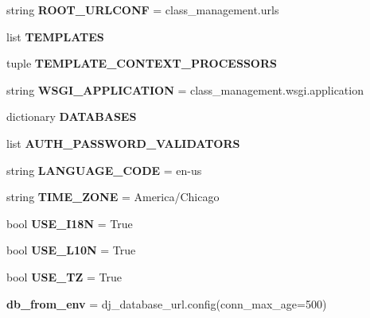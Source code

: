 \begin{DoxyCompactItemize}
string {\bfseries R\+O\+O\+T\+\_\+\+U\+R\+L\+C\+O\+NF} = \textquotesingle{}class\+\_\+management.\+urls\textquotesingle{}
\item 
list {\bfseries T\+E\+M\+P\+L\+A\+T\+ES}
\item 
tuple {\bfseries T\+E\+M\+P\+L\+A\+T\+E\+\_\+\+C\+O\+N\+T\+E\+X\+T\+\_\+\+P\+R\+O\+C\+E\+S\+S\+O\+RS}
\item 
\hypertarget{namespaceclass__management_1_1settings_a4daa790d95249e0381831ded20ae7fe8}{}\label{namespaceclass__management_1_1settings_a4daa790d95249e0381831ded20ae7fe8} 
string {\bfseries W\+S\+G\+I\+\_\+\+A\+P\+P\+L\+I\+C\+A\+T\+I\+ON} = \textquotesingle{}class\+\_\+management.\+wsgi.\+application\textquotesingle{}
\item 
dictionary {\bfseries D\+A\+T\+A\+B\+A\+S\+ES}
\item 
list {\bfseries A\+U\+T\+H\+\_\+\+P\+A\+S\+S\+W\+O\+R\+D\+\_\+\+V\+A\+L\+I\+D\+A\+T\+O\+RS}
\item 
\hypertarget{namespaceclass__management_1_1settings_a3d1bc70203582e588cc54fd61526f279}{}\label{namespaceclass__management_1_1settings_a3d1bc70203582e588cc54fd61526f279} 
string {\bfseries L\+A\+N\+G\+U\+A\+G\+E\+\_\+\+C\+O\+DE} = \textquotesingle{}en-\/us\textquotesingle{}
\item 
\hypertarget{namespaceclass__management_1_1settings_a6619fdf6cb6342bb4da80f9b66ca1850}{}\label{namespaceclass__management_1_1settings_a6619fdf6cb6342bb4da80f9b66ca1850} 
string {\bfseries T\+I\+M\+E\+\_\+\+Z\+O\+NE} = \textquotesingle{}America/Chicago\textquotesingle{}
\item 
\hypertarget{namespaceclass__management_1_1settings_aa25c16fec1031b695cf143a3d72852f6}{}\label{namespaceclass__management_1_1settings_aa25c16fec1031b695cf143a3d72852f6} 
bool {\bfseries U\+S\+E\+\_\+\+I18N} = True
\item 
\hypertarget{namespaceclass__management_1_1settings_abb530af04775c6901e2f28c694b04d52}{}\label{namespaceclass__management_1_1settings_abb530af04775c6901e2f28c694b04d52} 
bool {\bfseries U\+S\+E\+\_\+\+L10N} = True
\item 
\hypertarget{namespaceclass__management_1_1settings_ab09c8de4b8042c63cba915e6775cff43}{}\label{namespaceclass__management_1_1settings_ab09c8de4b8042c63cba915e6775cff43} 
bool {\bfseries U\+S\+E\+\_\+\+TZ} = True
\item 
\hypertarget{namespaceclass__management_1_1settings_a1cfea1961ac52e16a83db5f087f565ad}{}\label{namespaceclass__management_1_1settings_a1cfea1961ac52e16a83db5f087f565ad} 
{\bfseries db\+\_\+from\+\_\+env} = dj\+\_\+database\+\_\+url.\+config(conn\+\_\+max\+\_\+age=500)

\end{DoxyCompactItemize}

